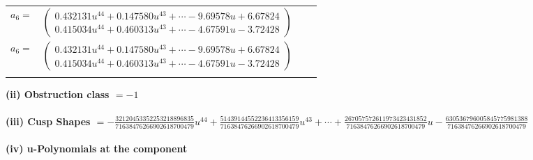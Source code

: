 \documentclass[1p]{elsarticle_modified}
\theoremstyle{definition}
\begin{document}
\begin{tabular}{m{7pt} m{180pt} m{7pt} m{180pt} }
\flushright $a_{6}=$&$\begin{pmatrix}0.432131 u^{44}+0.147580 u^{43}+\cdots-9.69578 u+6.67824\\0.415034 u^{44}+0.460313 u^{43}+\cdots-4.67591 u-3.72428\end{pmatrix}$\\ \flushright $a_{6}=$&$\begin{pmatrix}0.432131 u^{44}+0.147580 u^{43}+\cdots-9.69578 u+6.67824\\0.415034 u^{44}+0.460313 u^{43}+\cdots-4.67591 u-3.72428\end{pmatrix}$\\&\end{tabular}
\flushleft \textbf{(ii) Obstruction class $= -1$}\\~\\
\flushleft \textbf{(iii) Cusp Shapes $= -\frac{32120453352253218896835}{71638476266902618700479} u^{44}+\frac{51439144552236413356159}{71638476266902618700479} u^{43}+\cdots+\frac{267057572611973423431852}{71638476266902618700479} u-\frac{630536796005845775981388}{71638476266902618700479}$}\\~\\
\newpage\renewcommand{\arraystretch}{1}
\flushleft \textbf{(iv) u-Polynomials at the component}\newline \\
\end{document}
